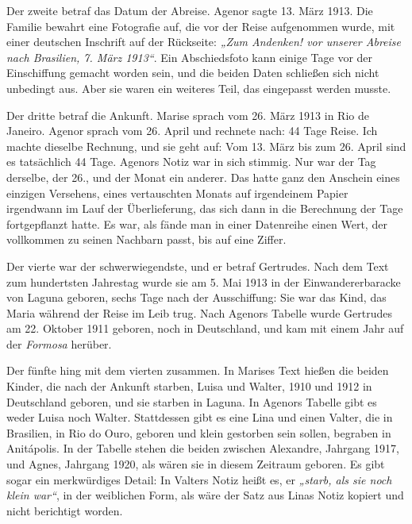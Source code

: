 \documentclass[
  ngerman,
  11pt,
  openany]{book}
\begin{document}
Der zweite betraf das Datum der Abreise. Agenor sagte 13. März 1913. Die
Familie bewahrt eine Fotografie auf, die vor der Reise aufgenommen
wurde, mit einer deutschen Inschrift auf der Rückseite: \emph{„Zum
Andenken! vor unserer Abreise nach Brasilien, 7. März 1913``}. Ein
Abschiedsfoto kann einige Tage vor der Einschiffung gemacht worden sein,
und die beiden Daten schließen sich nicht unbedingt aus. Aber sie waren
ein weiteres Teil, das eingepasst werden musste.

Der dritte betraf die Ankunft. Marise sprach vom 26. März 1913 in Rio de
Janeiro. Agenor sprach vom 26. April und rechnete nach: 44 Tage Reise.
Ich machte dieselbe Rechnung, und sie geht auf: Vom 13. März bis zum 26.
April sind es tatsächlich 44 Tage. Agenors Notiz war in sich stimmig.
Nur war der Tag derselbe, der 26., und der Monat ein anderer. Das hatte
ganz den Anschein eines einzigen Versehens, eines vertauschten Monats
auf irgendeinem Papier irgendwann im Lauf der Überlieferung, das sich
dann in die Berechnung der Tage fortgepflanzt hatte. Es war, als fände
man in einer Datenreihe einen Wert, der vollkommen zu seinen Nachbarn
passt, bis auf eine Ziffer.

Der vierte war der schwerwiegendste, und er betraf Gertrudes. Nach dem
Text zum hundertsten Jahrestag wurde sie am 5. Mai 1913 in der
Einwandererbaracke von Laguna geboren, sechs Tage nach der Ausschiffung:
Sie war das Kind, das Maria während der Reise im Leib trug. Nach Agenors
Tabelle wurde Gertrudes am 22. Oktober 1911 geboren, noch in
Deutschland, und kam mit einem Jahr auf der \emph{Formosa} herüber.

Der fünfte hing mit dem vierten zusammen. In Marises Text hießen die
beiden Kinder, die nach der Ankunft starben, Luisa und Walter, 1910 und
1912 in Deutschland geboren, und sie starben in Laguna. In Agenors
Tabelle gibt es weder Luisa noch Walter. Stattdessen gibt es eine Lina
und einen Valter, die in Brasilien, in Rio do Ouro, geboren und klein
gestorben sein sollen, begraben in Anitápolis. In der Tabelle stehen die
beiden zwischen Alexandre, Jahrgang 1917, und Agnes, Jahrgang 1920, als
wären sie in diesem Zeitraum geboren. Es gibt sogar ein merkwürdiges
Detail: In Valters Notiz heißt es, er \emph{„starb, als sie noch klein
war``}, in der weiblichen Form, als wäre der Satz aus Linas Notiz
kopiert und nicht berichtigt worden.
\end{document}
